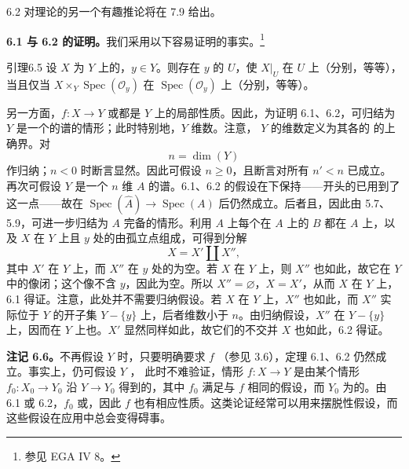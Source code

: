 6.2 对理论的另一个有趣推论将在 7.9 给出。

\textbf{6.1 与 6.2 的证明。}我们采用以下容易证明的事实。\footnote{参见 EGA IV 8。}
\begin{SGAresult}{引理}{6.5}
设 $X$ 为 $Y$ 上的，$y\in Y$。则存在 $y$ 的 $U$，使 $X|_U$ 在 $U$ 上（分别，等等），当且仅当 $X\times_Y\operatorname{Spec}(\mathcal O_y)$ 在 $\operatorname{Spec}(\mathcal O_y)$ 上（分别，等等）。
\end{SGAresult}
另一方面，$f:X\to Y$ 或都是 $Y$ 上的局部性质。因此，为证明 6.1、6.2，可归结为 $Y$ 是一个的谱的情形；此时特别地，$Y$ 维数。注意， $Y$ 的维数定义为其各的 的上确界。对
\[
n=\dim(Y)
\]
作归纳；$n<0$ 时断言显然。因此可假设 $n\geq0$，且断言对所有 $n'<n$ 已成立。再次可假设 $Y$ 是一个 $n$ 维 $A$ 的谱。6.1、6.2 的假设在下保持——开头的已用到了这一点——故在 $\operatorname{Spec}(\widehat A)\to\operatorname{Spec}(A)$ 后仍然成立。后者且，因此由 5.7、5.9，可进一步归结为 $A$ 完备的情形。利用 $A$ 上每个在 $A$ 上的 $B$ 都在 $A$ 上，以及 $X$ 在 $Y$ 上且 $y$ 处的由孤立点组成，可得到分解
\[
X=X'\amalg X'',
\]
其中 $X'$ 在 $Y$ 上，而 $X''$ 在 $y$ 处的为空。若 $X$ 在 $Y$ 上，则 $X''$ 也如此，故它在 $Y$ 中的像闭；这个像不含 $y$，因此为空。所以 $X''=\varnothing$，$X=X'$，从而 $X$ 在 $Y$ 上，6.1 得证。注意，此处并不需要归纳假设。若 $X$ 在 $Y$ 上，$X''$ 也如此，而 $X''$ 实际位于 $Y$ 的开子集 $Y-\{y\}$ 上，后者维数小于 $n$。由归纳假设，$X''$ 在 $Y-\{y\}$ 上，因而在 $Y$ 上也。$X'$ 显然同样如此，故它们的不交并 $X$ 也如此，6.2 得证。

\textbf{注记 6.6。}不再假设 $Y$ 时，只要明确要求 $f$ （参见 3.6），定理 6.1、6.2 仍然成立。事实上，仍可假设 $Y$ ，
此时不难验证，情形 $f:X\to Y$ 是由某个情形 $f_0:X_0\to Y_0$ 沿 $Y\to Y_0$ 得到的，其中 $f_0$ 满足与 $f$ 相同的假设，而 $Y_0$ 为的。由 6.1 或 6.2，$f_0$ 或，因此 $f$ 也有相应性质。这类论证经常可以用来摆脱性假设，而这些假设在应用中总会变得碍事。

